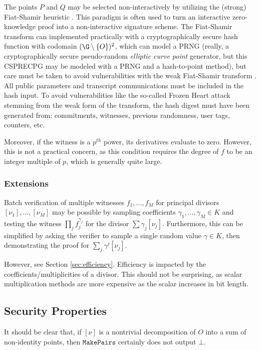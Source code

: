 \documentclass[11pt,letterpaper]{article}
\theoremstyle{definition}
\newcommand{\6}{\mathbf}
\newcommand{\7}{\mathcal}
\begin{document}
The points $P$ and $Q$ may be selected non-interactively by utilizing the (strong) Fiat-Shamir heuristic \cite{FiatShamir}.
This paradigm is often used to turn an interactive zero-knowledge proof into a non-interactive signature scheme.
The Fiat-Shamir transform can implemented practically with a cryptographically secure hash function with codomain $(\G\setminus\left\{O\right\})^2$, which can model a PRNG (really, a cryptographically secure pseudo-random \textit{elliptic curve point} generator, but this CSPRECPG may be modeled with a PRNG and a hash-to-point method), but care must be taken to avoid vulnerabilities with the weak Fiat-Shamir transform \cite{NHB,BPW,DMWG}. All public parameters and transcript communications must be included in the hash input.
To avoid vulnerabilities like the so-called Frozen Heart attack \cite{Marvinblog, FH3} stemming from the weak form of the transform, the hash digest must have been generated from: commitments, witnesses, previous randomness, user tags, counters, etc.

Moreover, if the witness is a $p^{th}$ power, its derivatives evaluate to zero. However, this is not a practical concern, as this condition requires the degree of $f$ to be an integer multiple of $p$, which is generally quite large. 

\subsubsection{Extensions}
Batch verification of multiple witnesses $f_1, \ldots, f_M$ for principal divisors $[\nu_1], \ldots, [\nu_M]$ may be possible by sampling coefficients $\gamma_1, \ldots, \gamma_M \in K$ and testing the witness $\prod_j f_j^{\gamma_j}$ for the divisor $\sum \gamma_j [\nu_j]$. 
Furthermore, this can be simplified by asking the verifier to sample a single random value $\gamma \in K$, then demonstrating the proof for $\sum_j \gamma^j [\nu_j]$. 

However, see Section \ref{sec:efficiency}. Efficiency is impacted by the coefficients/multiplicities of a divisor. This should not be surprising, as scalar multiplication methods are more expensive as the scalar increases in bit length.


\subsection{Security Properties}\label{sec:SecurityProps}

It should be clear that, if $[\nu]$ is a nontrivial decomposition of $O$ into a sum of non-identity points, then $\texttt{MakePairs}$ certainly does not output $\bot$. 
\end{document}

